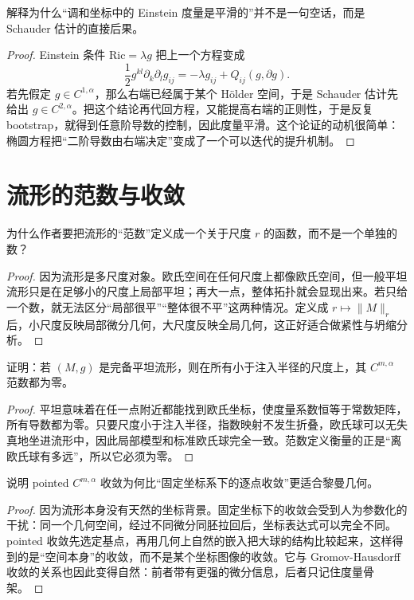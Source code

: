 \documentclass[11pt,a4paper,openany]{ctexbook}
\numberwithin{equation}{chapter}
\begin{document}
\begin{problem}
解释为什么“调和坐标中的 Einstein 度量是平滑的”并不是一句空话，而是 Schauder 估计的直接后果。
\end{problem}
\begin{proof}
Einstein 条件 \(\mathrm{Ric}=\lambda g\) 把上一个方程变成
\[
\frac12 g^{kl}\partial_k\partial_l g_{ij}= -\lambda g_{ij}+Q_{ij}(g,\partial g).
\]
若先假定 \(g\in C^{1,\alpha}\)，那么右端已经属于某个 Hölder 空间，于是 Schauder 估计先给出 \(g\in C^{2,\alpha}\)。把这个结论再代回方程，又能提高右端的正则性，于是反复 bootstrap，就得到任意阶导数的控制，因此度量平滑。这个论证的动机很简单：椭圆方程把“二阶导数由右端决定”变成了一个可以迭代的提升机制。  
\end{proof}

\section{流形的范数与收敛}

\begin{problem}
为什么作者要把流形的“范数”定义成一个关于尺度 \(r\) 的函数，而不是一个单独的数？
\end{problem}
\begin{proof}
因为流形是多尺度对象。欧氏空间在任何尺度上都像欧氏空间，但一般平坦流形只是在足够小的尺度上局部平坦；再大一点，整体拓扑就会显现出来。若只给一个数，就无法区分“局部很平”“整体很不平”这两种情况。定义成 \(r\mapsto \|M\|_r\) 后，小尺度反映局部微分几何，大尺度反映全局几何，这正好适合做紧性与坍缩分析。  
\end{proof}

\begin{problem}
证明：若 \((M,g)\) 是完备平坦流形，则在所有小于注入半径的尺度上，其 \(C^{m,\alpha}\) 范数都为零。
\end{problem}
\begin{proof}
平坦意味着在任一点附近都能找到欧氏坐标，使度量系数恒等于常数矩阵，所有导数都为零。只要尺度小于注入半径，指数映射不发生折叠，欧氏球可以无失真地坐进流形中，因此局部模型和标准欧氏球完全一致。范数定义衡量的正是“离欧氏球有多远”，所以它必须为零。  
\end{proof}

\begin{problem}
说明 pointed \(C^{m,\alpha}\) 收敛为何比“固定坐标系下的逐点收敛”更适合黎曼几何。
\end{problem}
\begin{proof}
因为流形本身没有天然的坐标背景。固定坐标下的收敛会受到人为参数化的干扰：同一个几何空间，经过不同微分同胚拉回后，坐标表达式可以完全不同。pointed 收敛先选定基点，再用几何上自然的嵌入把大球的结构比较起来，这样得到的是“空间本身”的收敛，而不是某个坐标图像的收敛。它与 Gromov-Hausdorff 收敛的关系也因此变得自然：前者带有更强的微分信息，后者只记住度量骨架。  
\end{proof}
\end{document}
